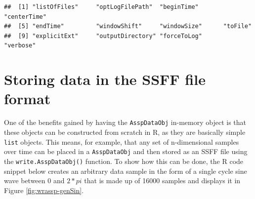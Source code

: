 \documentclass[]{book}
\newenvironment{Shaded}{\begin{snugshade}}{\end{snugshade}}
\newcommand{\CommentTok}[1]{\textcolor[rgb]{0.56,0.35,0.01}{\textit{#1}}}
\newcommand{\DataTypeTok}[1]{\textcolor[rgb]{0.13,0.29,0.53}{#1}}
\newcommand{\DecValTok}[1]{\textcolor[rgb]{0.00,0.00,0.81}{#1}}
\newcommand{\KeywordTok}[1]{\textcolor[rgb]{0.13,0.29,0.53}{\textbf{#1}}}
\newcommand{\NormalTok}[1]{#1}
\newcommand{\OperatorTok}[1]{\textcolor[rgb]{0.81,0.36,0.00}{\textbf{#1}}}
\newcommand{\OtherTok}[1]{\textcolor[rgb]{0.56,0.35,0.01}{#1}}
\newcommand{\StringTok}[1]{\textcolor[rgb]{0.31,0.60,0.02}{#1}}
\begin{document}
\begin{verbatim}
##  [1] "listOfFiles"     "optLogFilePath"  "beginTime"       "centerTime"     
##  [5] "endTime"         "windowShift"     "windowSize"      "toFile"         
##  [9] "explicitExt"     "outputDirectory" "forceToLog"      "verbose"
\end{verbatim}

\begin{Shaded}
\end{Shaded}

\hypertarget{sec:wrassp_genSSFF}{%
\section{Storing data in the SSFF file format}\label{sec:wrassp_genSSFF}}

One of the benefits gained by having the \texttt{AsspDataObj} in-memory object is that these objects can be constructed from scratch in R, as they are basically simple \texttt{list} objects. This means, for example, that any set of n-dimensional samples over time can be placed in a \texttt{AsspDataObj} and then stored as an SSFF file using the \texttt{write.AsspDataObj()} function. To show how this can be done, the R code snippet below creates an arbitrary data sample in the form of a single cycle sine wave between \(0\) and \(2*pi\) that is made up of 16000 samples and displays it in Figure \ref{fig:wrassp-genSin}.
\end{document}
